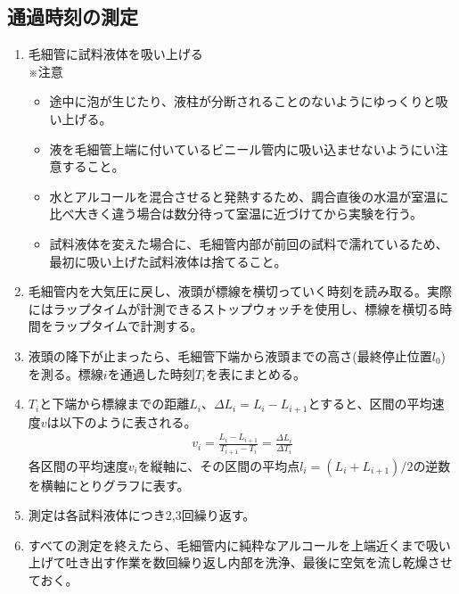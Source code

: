 \documentclass[a4j,10pt]{jarticle}
\begin{document}
\subsection{通過時刻の測定}
\begin{enumerate}
\item 毛細管に試料液体を吸い上げる\\
※注意
\begin{itemize}
\item 途中に泡が生じたり、液柱が分断されることのないようにゆっくりと吸い上げる。
\item 液を毛細管上端に付いているビニール管内に吸い込ませないようにい注意すること。
\item 水とアルコールを混合させると発熱するため、調合直後の水温が室温に比べ大きく違う場合は数分待って室温に近づけてから実験を行う。
\item 試料液体を変えた場合に、毛細管内部が前回の試料で濡れているため、最初に吸い上げた試料液体は捨てること。
\end{itemize}
\item 毛細管内を大気圧に戻し、液頭が標線を横切っていく時刻を読み取る。実際にはラップタイムが計測できるストップウォッチを使用し、標線を横切る時間をラップタイムで計測する。
\item 液頭の降下が止まったら、毛細管下端から液頭までの高さ(最終停止位置$l_0$)を測る。標線$i$を通過した時刻$T_i$を表にまとめる。
\item $T_i$と下端から標線までの距離$L_i$、$\Delta L_i=L_i-L_{i+1}$とすると、区間の平均速度$v$は以下のように表される。
\begin{eqnarray}
\label{avr-v}
v_i=\frac{L_i-L_{i+1}}{T_{i+1}-T_i}=\frac{\Delta L_i}{\Delta T_i}
\end{eqnarray}
各区間の平均速度$v_i$を縦軸に、その区間の平均点$l_i=(L_i+L_{i+1})/2$の逆数を横軸にとりグラフに表す。
\item 測定は各試料液体につき2,3回繰り返す。
\item すべての測定を終えたら、毛細管内に純粋なアルコールを上端近くまで吸い上げて吐き出す作業を数回繰り返し内部を洗浄、最後に空気を流し乾燥させておく。
\end{enumerate}
\end{document}
